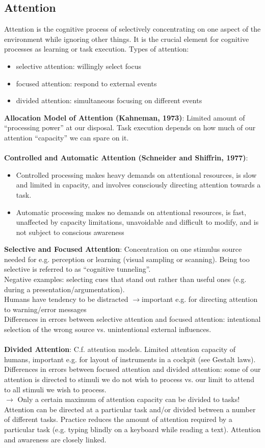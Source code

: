 \subsection{Attention}
Attention is the cognitive process of selectively concentrating on one aspect of the environment while ignoring other things. It is the crucial element for cognitive processes as
learning or task execution. Types of attention:
\begin{itemize}
\item selective attention: willingly select focus
\item focused attention: respond to external events
\item divided attention: simultaneous focusing on different events
\end{itemize}
\textbf{Allocation Model of Attention (Kahneman, 1973)}:
Limited amount of ``processing power'' at our disposal. Task execution depends on how much of our attention ``capacity'' we can spare on it.\\\\
\textbf{Controlled and Automatic Attention (Schneider and Shiffrin, 1977)}:
\begin{itemize}
\item Controlled processing makes heavy demands on attentional resources, is slow and limited in capacity, and involves consciously directing attention towards a task.
\item Automatic processing makes no demands on attentional resources, is fast, unaffected by capacity limitations, unavoidable and difficult to modify, and is not subject to conscious awareness
\end{itemize}
\textbf{Selective and Focused Attention}:
Concentration on one stimulus source needed for e.g. perception or learning (visual sampling or scanning). Being too selective is referred to as ``cognitive tunneling''.\\
Negative examples: selecting cues that stand out rather than useful ones (e.g. during a presentation/argumentation).\\
Humans have tendency to be distracted $\rightarrow$important e.g. for directing attention to warning/error messages\\
Differences in errors between selective attention and focused attention: intentional selection of the wrong source vs. unintentional external influences.\\\\
\textbf{Divided Attention}:
C.f. attention models. Limited attention capacity of humans, important e.g. for layout of instruments in a cockpit (see Gestalt laws). Differences in errors between focused attention and
divided attention: some of our attention is directed to stimuli we do not wish to process vs. our limit to attend to all stimuli we wish to process.\\
$\rightarrow$ Only a certain maximum of attention capacity can be divided to tasks!\\
Attention can be directed at a particular task and/or divided between a number of different tasks. Practice reduces the amount of attention required by a particular task (e.g. typing blindly on a keyboard while reading a text). Attention and awareness are closely linked.

